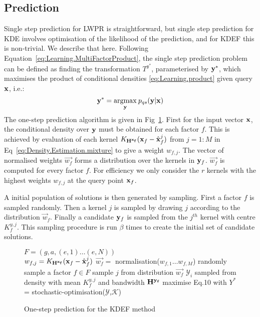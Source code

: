 \subsection{Prediction}
Single step prediction for LWPR is straightforward, but single step prediction for KDE involves optimisation of the likelihood of the prediction, and for KDEF this is non-trivial. We describe that here. Following Equation~\eqref{eq:Learning.MultiFactorProduct},
the single step prediction problem can be defined as finding the
transformation $T^{y^*}$, parameterised by $\mathbf{y}^*$, which maximises the product of conditional densities
\eqref{eq:Learning.product} given query $\mathbf{x}$, i.e.:
\begin{equation}
 \by^*= \argmax{\by} p_{qs}(\by|\bx)
\label{eq:Density.Estimation.max}
\end{equation}
The one-step prediction algorithm is given in Fig~\ref{alg:prediction}. First for the input vector $\mathbf{x}$, the conditional density over $\mathbf{y}$ must be obtained for each factor $f$. This is achieved by evaluation of each kernel  $K_{\mathbf{H^{\mathbf{x}_f}}}(\mathbf{x}_f - \hat{\mathbf{x}}_f^j)$ from $j=1:M$ in Eq~\eqref{eq:Density.Estimation.mixture} to give a weight $w_{f,j}$. The vector of normalised weights $\vec{w_f}$ forms a distribution over the kernels in $\mathbf{y}_f$. $\vec{w_f}$ is computed for every factor $f$. For efficiency we only consider the $r$ kernels with the highest weights $w_{f,j}$ at the query point $\mathbf{x}_f$. 

A initial population of solutions is then generated by sampling. First a factor $f$ is sampled randomly. Then a kernel $j$ is sampled by drawing $j$ according to the distribution $\vec{w}_f$. Finally a candidate $\mathbf{y}_f$ is sampled from the $j^{th}$ kernel with centre $K^{y,j}_f$. This sampling procedure is run $\beta$ times to create the initial set of candidate solutions.
\begin{figure}
\label{alg:prediction}
\begin{algorithmic}
\STATE $F = (g, a, (e,1) \ldots (e,N))$  \\
\STATE $w_{f,j} = K_{\mathbf{H^{\mathbf{x}_f}}}(\mathbf{x}_f - \hat{\mathbf{x}}_f^j)$
\ENDFOR
\STATE $\vec{w_f} =$ normalisation($w_{f,1} \ldots w_{f,M}$)
\ENDFOR
{}
\STATE randomly sample a factor $f\in F$ 
\STATE sample $j$ from distribution $\vec{w_f}$
\STATE  $\mathcal{Y}_i$ sampled from density with mean $K^{y,j}_f$ and bandwidth $\mathbf{H^{\mathbf{y}_f}}$
\ENDFOR
\STATE maximise Eq.10 with $Y^*$ = stochastic-optimisation($\mathcal{Y}$,$\mathcal{K}$) 
\end{algorithmic}
\caption{One-step prediction for the KDEF method}
\end{figure}

